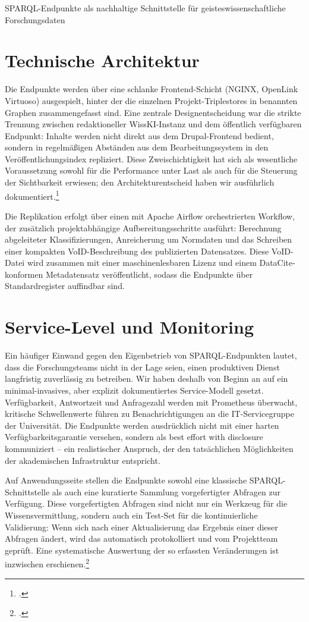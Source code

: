 \begin{beitrag}{SPARQL-Endpunkte als nachhaltige Schnittstelle für geisteswissenschaftliche Forschungsdaten}
\section{Technische Architektur}
Die Endpunkte werden über eine schlanke Frontend-Schicht (NGINX, OpenLink Virtuoso) ausgespielt, hinter der die einzelnen Projekt-Triplestores in benannten Graphen zusammengefasst sind. Eine zentrale Designentscheidung war die strikte Trennung zwischen redaktioneller WissKI-Instanz und dem öffentlich verfügbaren Endpunkt: Inhalte werden nicht direkt aus dem Drupal-Frontend bedient, sondern in regelmäßigen Abständen aus dem Bearbeitungssystem in den Veröffentlichungsindex repliziert. Diese Zweischichtigkeit hat sich als wesentliche Voraussetzung sowohl für die Performance unter Last als auch für die Steuerung der Sichtbarkeit erwiesen; den Architekturentscheid haben wir ausführlich dokumentiert.\footcite[27]{gaertner2024-sparql-architektur}

Die Replikation erfolgt über einen mit Apache Airflow orchestrierten Workflow, der zusätzlich projektabhängige Aufbereitungsschritte ausführt: Berechnung abgeleiteter Klassifizierungen, Anreicherung um Normdaten und das Schreiben einer kompakten VoID-Beschreibung des publizierten Datensatzes. Diese VoID-Datei wird zusammen mit einer maschinenlesbaren Lizenz und einem DataCite-konformen Metadatensatz veröffentlicht, sodass die Endpunkte über Standardregister auffindbar sind.

\section{Service-Level und Monitoring}
Ein häufiger Einwand gegen den Eigenbetrieb von SPARQL-Endpunkten lautet, dass die Forschungsteams nicht in der Lage seien, einen produktiven Dienst langfristig zuverlässig zu betreiben. Wir haben deshalb von Beginn an auf ein minimal-invasives, aber explizit dokumentiertes Service-Modell gesetzt. Verfügbarkeit, Antwortzeit und Anfragezahl werden mit Prometheus überwacht, kritische Schwellenwerte führen zu Benachrichtigungen an die IT-Servicegruppe der Universität. Die Endpunkte werden ausdrücklich nicht mit einer harten Verfügbarkeitsgarantie versehen, sondern als \glqq best effort with disclosure\grqq{} kommuniziert -- ein realistischer Anspruch, der den tatsächlichen Möglichkeiten der akademischen Infrastruktur entspricht.

Auf Anwendungsseite stellen die Endpunkte sowohl eine klassische SPARQL-Schnittstelle als auch eine kuratierte Sammlung vorgefertigter Abfragen zur Verfügung. Diese vorgefertigten Abfragen sind nicht nur ein Werkzeug für die Wissensvermittlung, sondern auch ein Test-Set für die kontinuierliche Validierung: Wenn sich nach einer Aktualisierung das Ergebnis einer dieser Abfragen ändert, wird das automatisch protokolliert und vom Projektteam geprüft. Eine systematische Auswertung der so erfassten Veränderungen ist inzwischen erschienen.\footcite[205]{hauser2025-endpunkt-monitoring}


\end{beitrag}

